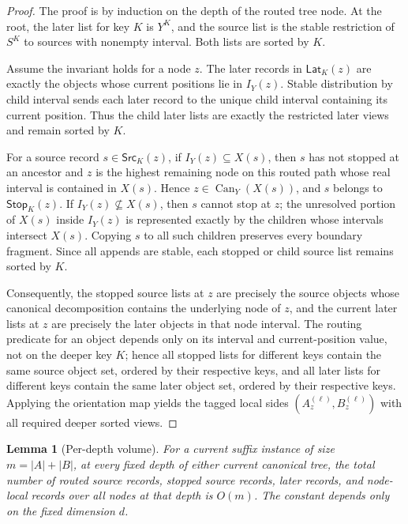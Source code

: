 \documentclass[11pt]{article}
\newcommand{\Can}{\operatorname{Can}}
\newcommand{\Src}{\ensuremath{\mathsf{Src}}}
\newcommand{\Lat}{\ensuremath{\mathsf{Lat}}}
\newcommand{\Stop}{\ensuremath{\mathsf{Stop}}}
\newtheorem{lemma}[theorem]{Lemma}
\theoremstyle{definition}
\begin{document}
\begin{proof}
The proof is by induction on the depth of the routed tree node.  At the root, the later list for key $K$ is $Y^K$, and the source list is the stable restriction of $S^K$ to sources with nonempty interval.  Both lists are sorted by $K$.

Assume the invariant holds for a node $z$.  The later records in $\Lat_K(z)$ are exactly the objects whose current positions lie in $I_Y(z)$.  Stable distribution by child interval sends each later record to the unique child interval containing its current position.  Thus the child later lists are exactly the restricted later views and remain sorted by $K$.

For a source record $s\in\Src_K(z)$, if $I_Y(z)\subseteq X(s)$, then $s$ has not stopped at an ancestor and $z$ is the highest remaining node on this routed path whose real interval is contained in $X(s)$.  Hence $z\in\Can_Y(X(s))$, and $s$ belongs to $\Stop_K(z)$.  If $I_Y(z)\nsubseteq X(s)$, then $s$ cannot stop at $z$; the unresolved portion of $X(s)$ inside $I_Y(z)$ is represented exactly by the children whose intervals intersect $X(s)$.  Copying $s$ to all such children preserves every boundary fragment.  Since all appends are stable, each stopped or child source list remains sorted by $K$.

Consequently, the stopped source lists at $z$ are precisely the source objects whose canonical decomposition contains the underlying node of $z$, and the current later lists at $z$ are precisely the later objects in that node interval.  The routing predicate for an object depends only on its interval and current-position value, not on the deeper key $K$; hence all stopped lists for different keys contain the same source object set, ordered by their respective keys, and all later lists for different keys contain the same later object set, ordered by their respective keys.  Applying the orientation map yields the tagged local sides $(A_z^{(\ell)},B_z^{(\ell)})$ with all required deeper sorted views.
\end{proof}

\begin{lemma}[Per-depth volume]
\label{lem:per-depth}
For a current suffix instance of size $m=|A|+|B|$, at every fixed depth of either current canonical tree, the total number of routed source records, stopped source records, later records, and node-local records over all nodes at that depth is $O(m)$.  The constant depends only on the fixed dimension $d$.
\end{lemma}
\end{document}
